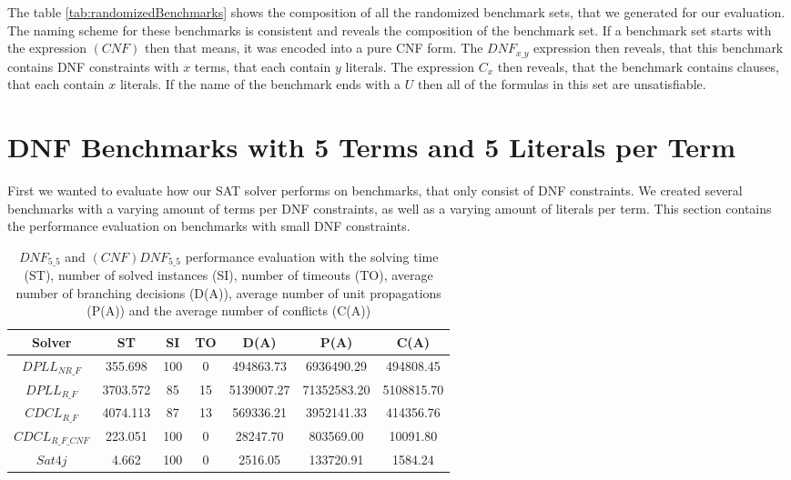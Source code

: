 The table \ref{tab:randomizedBenchmarks} shows the composition of all the randomized benchmark sets, that we generated for our evaluation. The naming scheme for these benchmarks is consistent and reveals the composition of the benchmark set. If a benchmark set starts with the expression $(CNF)$ then that means, it was encoded into a pure CNF form. The $DNF_{x\_y}$ expression then reveals, that this benchmark contains DNF constraints with $x$ terms, that each contain $y$ literals. The expression $C_x$ then reveals, that the benchmark contains clauses, that each contain $x$ literals. If the name of the benchmark ends with a $U$ then all of the formulas in this set are unsatisfiable.

\section{DNF Benchmarks with 5 Terms and 5 Literals per Term}

First we wanted to evaluate how our SAT solver performs on benchmarks, that only consist of DNF constraints. We created several benchmarks with a varying amount of terms per DNF constraints, as well as a varying amount of literals per term. This section contains the performance evaluation on benchmarks with small DNF constraints.

\begin{table}[!htb]
\centering
\caption[$DNF_{5\_5}$ and $(CNF)DNF_{5\_5}$ performance evaluation]{$DNF_{5\_5}$ and $(CNF)DNF_{5\_5}$ performance evaluation with the solving time (ST), number of solved instances (SI), number of timeouts (TO), average number of branching decisions (D(A)), average number of unit propagations (P(A)) and the average number of conflicts (C(A))}
\label{tab:dnf55Sat}
\begin{tabular}{|c|c|c|c|c|c|c|}
\hline
Solver & ST & SI & TO & D(A) & P(A) & C(A)\\ 
\hline
$DPLL_{NR\_F}$ & 355.698 & 100 & 0 & 494863.73 & 6936490.29 & 494808.45 \\ 
\hline
$DPLL_{R\_F}$ & 3703.572 & 85 & 15 & 5139007.27 & 71352583.20 & 5108815.70 \\ 
\hline
$CDCL_{R\_F}$ & 4074.113 & 87 & 13 & 569336.21 & 3952141.33 & 414356.76 \\ 
\hline
$CDCL_{R\_F\_CNF}$ & 223.051 & 100 & 0 & 28247.70 & 803569.00 & 10091.80 \\ 
\hline
$Sat4j$ & 4.662 & 100 & 0 & 2516.05 & 133720.91 & 1584.24 \\ 
\hline
\end{tabular}
\end{table}

